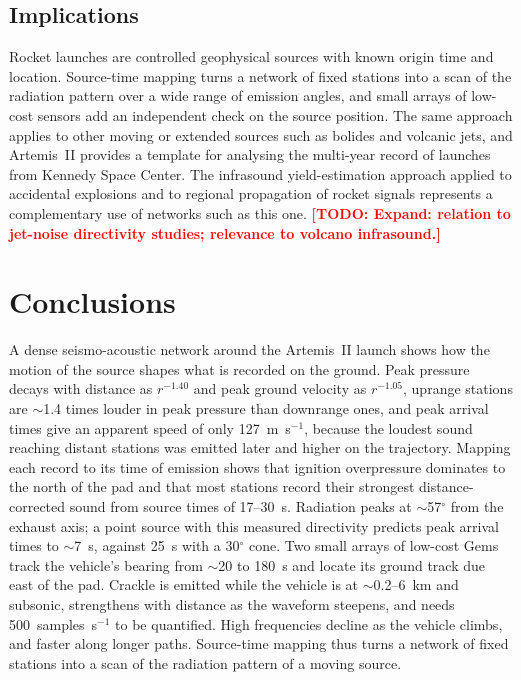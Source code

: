 \documentclass[]{seismica}
\newcommand{\todo}[1]{\textcolor{red}{\textbf{[TODO: #1]}}}
\begin{document}
\subsection{Implications}

Rocket launches are controlled geophysical sources with known origin
time and location. Source-time mapping turns a network of fixed stations
into a scan of the radiation pattern over a wide range of emission
angles, and small arrays of low-cost sensors add an independent check on
the source position. The same approach applies to other moving or
extended sources such as bolides and volcanic jets, and Artemis~II
provides a template for analysing the multi-year record of launches from
Kennedy Space Center. The infrasound yield-estimation approach applied to
accidental explosions \citep{silber_scamfer_newglenn_2026} and to
regional propagation of rocket signals \citep{Pilger2021} represents a
complementary use of networks such as this one.
\todo{Expand: relation to jet-noise directivity studies; relevance to
volcano infrasound.}


\section{Conclusions}

A dense seismo-acoustic network around the Artemis~II launch shows how
the motion of the source shapes what is recorded on the ground. Peak
pressure decays with distance as $r^{-1.40}$ and peak ground velocity as
$r^{-1.05}$, uprange stations are $\sim$1.4 times louder in peak
pressure than downrange ones, and peak arrival times give an apparent
speed of only 127~m~s$^{-1}$, because the loudest sound reaching distant
stations was emitted later and higher on the trajectory. Mapping each
record to its time of emission shows that ignition overpressure
dominates to the north of the pad and that most stations record their
strongest distance-corrected sound from source times of 17--30~s.
Radiation peaks at $\sim$57$^{\circ}$ from the exhaust axis; a point
source with this measured directivity predicts peak arrival times to
$\sim$7~s, against 25~s with a 30$^{\circ}$ cone. Two small arrays of
low-cost Gems track the vehicle's bearing from $\sim$20 to 180~s and
locate its ground track due east of the pad. Crackle is emitted while
the vehicle is at $\sim$0.2--6~km and subsonic, strengthens with
distance as the waveform steepens, and needs 500~samples~s$^{-1}$ to be
quantified. High frequencies decline as the vehicle climbs, and faster
along longer paths. Source-time mapping thus turns a network of fixed
stations into a scan of the radiation pattern of a moving source.
\end{document}
